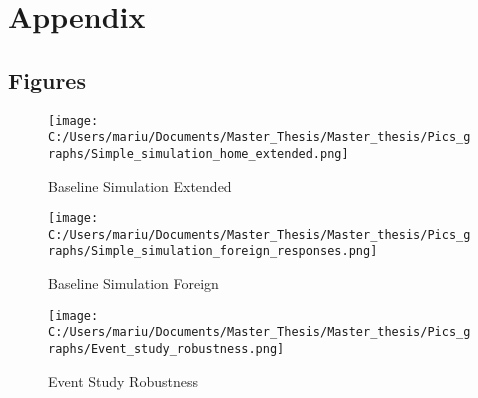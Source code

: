\documentclass{article}
\begin{document}
\pagebreak




\pagebreak
\section{Appendix}


\subsection*{Figures}
\begin{figure}[!ht]
\begin{center}\caption{Baseline Simulation Extended \label{Baseline Simulation Extended}}
\texttt{[image: C:/Users/mariu/Documents/Master\_Thesis/Master\_thesis/Pics\_graphs/Simple\_simulation\_home\_extended.png]}\\
\end{center}
\end{figure}

\begin{figure}[!ht]
\begin{center}\caption{Baseline Simulation Foreign \label{Baseline Simulation Foreign}}
\texttt{[image: C:/Users/mariu/Documents/Master\_Thesis/Master\_thesis/Pics\_graphs/Simple\_simulation\_foreign\_responses.png]}\\
\end{center}
\end{figure}

\pagebreak 

\begin{figure}[!ht]
\begin{center}\caption{Event Study Robustness \label{Event Study Robustness}}
\texttt{[image: C:/Users/mariu/Documents/Master\_Thesis/Master\_thesis/Pics\_graphs/Event\_study\_robustness.png]}\\
\end{center}
\end{figure}

\pagebreak
\end{document}
